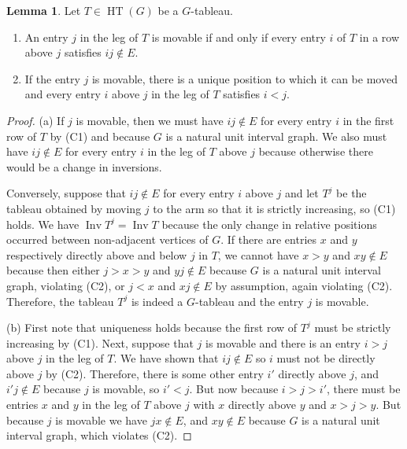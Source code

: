 \documentclass[12pt]{amsart}  %
\theoremstyle{definition}
\newtheorem{lemma}[theorem]{Lemma}
\theoremstyle{remark}
\numberwithin{equation}{section}
\DeclareMathOperator{\Inv}{Inv}
\DeclareMathOperator{\HT}{HT}
\begin{document}
\begin{lemma} \label{lem:legtoarm}
Let $T\in\HT(G)$ be a $G$-tableau. 

\begin{enumerate}
\item[(a)] An entry $j$ in the leg of $T$ is movable if and only if every entry $i$ of $T$ in a row above $j$ satisfies $ij\notin E$. 
\item[(b)] If the entry $j$ is movable, there is a unique position to which it can be moved and every entry $i$ above $j$ in the leg of $T$ satisfies $i<j$. 
\end{enumerate}

\end{lemma}

\begin{proof}
(a) If $j$ is movable, then we must have $ij\notin E$ for every entry $i$ in the first row of $T$ by (C1) and because $G$ is a natural unit interval graph. We also must have $ij\notin E$ for every entry $i$ in the leg of $T$ above $j$ because otherwise there would be a change in inversions. 

Conversely, suppose that $ij\notin E$ for every entry $i$ above $j$ and let $T^j$ be the tableau obtained by moving $j$ to the arm so that it is strictly increasing, so (C1) holds. We have $\Inv T^j=\Inv T$ because the only change in relative positions occurred between non-adjacent vertices of $G$. If there are entries $x$ and $y$ respectively directly above and below $j$ in $T$, we cannot have $x>y$ and $xy\notin E$ because then either $j>x>y$ and $yj\notin E$ because $G$ is a natural unit interval graph, violating (C2), or $j<x$  and $xj\notin E$ by assumption, again violating (C2). Therefore, the tableau $T^j$ is indeed a $G$-tableau and the entry $j$ is movable.

(b) First note that uniqueness holds because the first row of $T^j$ must be strictly increasing by (C1).  Next, suppose that $j$ is movable and there is an entry $i>j$ above $j$ in the leg of $T$. We have shown that $ij\notin E$ so $i$ must not be directly above $j$ by (C2). Therefore, there is some other entry $i'$ directly above $j$, and $i'j\not\in E$ because $j$ is movable, so $i'<j$. But now because $i>j>i'$, there must be entries $x$ and $y$ in the leg of $T$ above $j$ with $x$ directly above $y$ and $x>j>y$. But because $j$ is movable we have $jx\notin E$, and $xy\notin E$ because $G$ is a natural unit interval graph, which violates (C2).
\end{proof}
\end{document}
